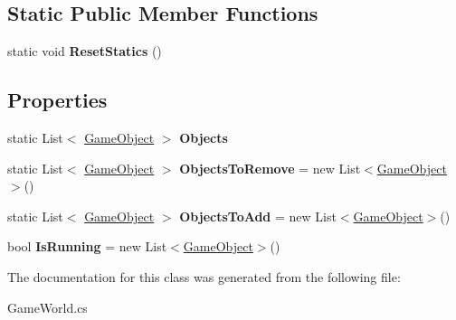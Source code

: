 \subsection*{Static Public Member Functions}
\begin{DoxyCompactItemize}
\item 
\hypertarget{class_mage_twinstick_1_1_game_world_a26a5ac69da767a8aeae994f601a24368}{}static void {\bfseries Reset\+Statics} ()\label{class_mage_twinstick_1_1_game_world_a26a5ac69da767a8aeae994f601a24368}

\end{DoxyCompactItemize}
\subsection*{Properties}
\begin{DoxyCompactItemize}
\item 
\hypertarget{class_mage_twinstick_1_1_game_world_aa08512629d71365bea26ea059020f4ca}{}static List$<$ \hyperlink{class_mage_twinstick_1_1_game_object}{Game\+Object} $>$ {\bfseries Objects}\label{class_mage_twinstick_1_1_game_world_aa08512629d71365bea26ea059020f4ca}

\item 
\hypertarget{class_mage_twinstick_1_1_game_world_af930b76068ef6637bb77fdcfd877a8f1}{}static List$<$ \hyperlink{class_mage_twinstick_1_1_game_object}{Game\+Object} $>$ {\bfseries Objects\+To\+Remove} = new List$<$\hyperlink{class_mage_twinstick_1_1_game_object}{Game\+Object}$>$()\label{class_mage_twinstick_1_1_game_world_af930b76068ef6637bb77fdcfd877a8f1}

\item 
\hypertarget{class_mage_twinstick_1_1_game_world_a70ecede9da55d25220e0f524f760bcff}{}static List$<$ \hyperlink{class_mage_twinstick_1_1_game_object}{Game\+Object} $>$ {\bfseries Objects\+To\+Add} = new List$<$\hyperlink{class_mage_twinstick_1_1_game_object}{Game\+Object}$>$()\label{class_mage_twinstick_1_1_game_world_a70ecede9da55d25220e0f524f760bcff}

\item 
\hypertarget{class_mage_twinstick_1_1_game_world_a290958754111288c5ca43339fd2a2fb7}{}bool {\bfseries Is\+Running} = new List$<$\hyperlink{class_mage_twinstick_1_1_game_object}{Game\+Object}$>$()\label{class_mage_twinstick_1_1_game_world_a290958754111288c5ca43339fd2a2fb7}

\end{DoxyCompactItemize}


The documentation for this class was generated from the following file\+:\begin{DoxyCompactItemize}
\item 
Game\+World.\+cs\end{DoxyCompactItemize}
